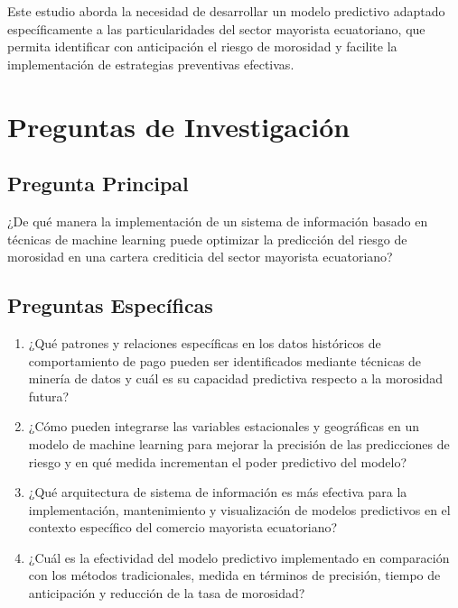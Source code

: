Este estudio aborda la necesidad de desarrollar un modelo predictivo adaptado específicamente a las particularidades del sector mayorista ecuatoriano, que permita identificar con anticipación el riesgo de morosidad y facilite la implementación de estrategias preventivas efectivas.

\section{Preguntas de Investigación}

\subsection{Pregunta Principal}

¿De qué manera la implementación de un sistema de información basado en técnicas de machine learning puede optimizar la predicción del riesgo de morosidad en una cartera crediticia del sector mayorista ecuatoriano?

\subsection{Preguntas Específicas}

\begin{enumerate}
    \item ¿Qué patrones y relaciones específicas en los datos históricos de comportamiento de pago pueden ser identificados mediante técnicas de minería de datos y cuál es su capacidad predictiva respecto a la morosidad futura?
    
    \item ¿Cómo pueden integrarse las variables estacionales y geográficas en un modelo de machine learning para mejorar la precisión de las predicciones de riesgo y en qué medida incrementan el poder predictivo del modelo?
    
    \item ¿Qué arquitectura de sistema de información es más efectiva para la implementación, mantenimiento y visualización de modelos predictivos en el contexto específico del comercio mayorista ecuatoriano?
    
    \item ¿Cuál es la efectividad del modelo predictivo implementado en comparación con los métodos tradicionales, medida en términos de precisión, tiempo de anticipación y reducción de la tasa de morosidad?
\end{enumerate}

